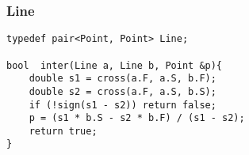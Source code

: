 \subsubsection{Line}
\begin{verbatim}
typedef pair<Point, Point> Line;

bool  inter(Line a, Line b, Point &p){
	double s1 = cross(a.F, a.S, b.F);
	double s2 = cross(a.F, a.S, b.S);
	if (!sign(s1 - s2)) return false;
	p = (s1 * b.S - s2 * b.F) / (s1 - s2);
	return true;
}
\end{verbatim}
